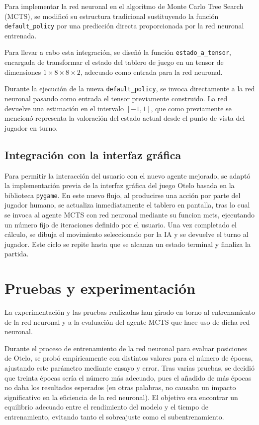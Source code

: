 \documentclass[conference]{IEEEtran}
\begin{document}
Para implementar la red neuronal en el algoritmo de Monte Carlo Tree Search (MCTS), se modificó su estructura tradicional sustituyendo la función \texttt{default\_policy} por una predicción directa proporcionada por la red neuronal entrenada. 

Para llevar a cabo esta integración, se diseñó la función \texttt{estado\_a\_tensor}, encargada de transformar el estado del tablero de juego en un tensor de dimensiones $1 \times 8 \times 8 \times 2$, adecuado como entrada para la red neuronal. 

Durante la ejecución de la nueva \texttt{default\_policy}, se invoca directamente a la red neuronal pasando como entrada el tensor previamente construido. La red devuelve una estimación en el intervalo $[-1, 1]$, que como previamente se mencionó representa la valoración del estado actual desde el punto de vista del jugador en turno. 

\subsection{Integración con la interfaz gráfica}

Para permitir la interacción del usuario con el nuevo agente mejorado, se adaptó la implementación previa de la interfaz gráfica del juego Otelo basada en la biblioteca \texttt{pygame}. En este nuevo flujo, al producirse una acción por parte del jugador humano, se actualiza inmediatamente el tablero en pantalla, tras lo cual se invoca al agente MCTS con red neuronal mediante su funcion mcts, ejecutando un número fijo de iteraciones definido por el usuario. Una vez completado el cálculo, se dibuja el movimiento seleccionado por la IA y se devuelve el turno al jugador. Este ciclo se repite hasta que se alcanza un estado terminal y finaliza la partida.

\section{Pruebas y experimentación}
La experimentación y las pruebas realizadas han girado en torno al entrenamiento de la red neuronal y a la evaluación del agente MCTS que hace uso de dicha red neuronal.

Durante el proceso de entrenamiento de la red neuronal para evaluar posiciones de Otelo, se probó empíricamente con distintos valores para el número de épocas, ajustando este parámetro mediante ensayo y error. Tras varias pruebas, se decidió que treinta épocas sería el número más adecuado, pues el añadido de más épocas no daba los resultados esperados (en otras palabras, no causaba un impacto significativo en la eficiencia de la red neuronal). El objetivo era encontrar un equilibrio adecuado entre el rendimiento del modelo y el tiempo de entrenamiento, evitando tanto el sobreajuste como el subentrenamiento.
\end{document}
